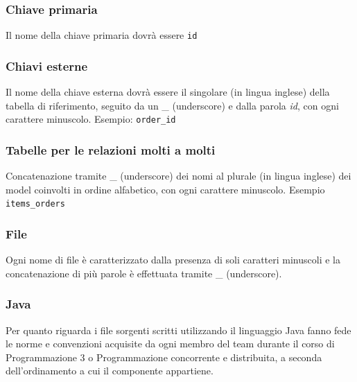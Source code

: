 \documentclass[11pt,a4paper]{article}
\begin{document}
\subsubsection*{Chiave primaria}
Il nome della chiave primaria dovrà essere \verb|id|
\subsubsection*{Chiavi esterne}
Il nome della chiave esterna dovrà essere il singolare (in lingua inglese) della tabella di riferimento, seguito da un \_ (underscore) e dalla parola \textit{id}, con ogni carattere minuscolo. Esempio: \verb|order_id|
\subsubsection*{Tabelle per le relazioni molti a molti}
Concatenazione tramite \_ (underscore) dei nomi al plurale (in lingua inglese) dei model coinvolti in ordine alfabetico, con ogni carattere minuscolo. Esempio \verb|items_orders|
\subsubsection*{File}
Ogni nome di file è caratterizzato dalla presenza di soli caratteri minuscoli e la concatenazione di più parole è effettuata tramite \_ (underscore).
\subsubsection{Java}
Per quanto riguarda i file sorgenti scritti utilizzando il linguaggio Java fanno fede le norme e convenzioni acquisite da ogni membro del team durante il corso di Programmazione 3 o Programmazione concorrente e distribuita, a seconda dell'ordinamento a cui il componente appartiene.
\end{document}
